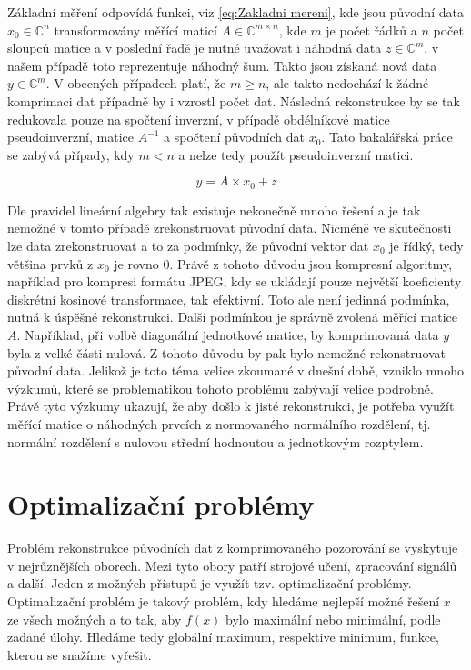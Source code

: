 \documentclass[FM,BP]{tulthesis}
\newcounter{Vzorce}
\begin{document}
Základní měření odpovídá funkci, viz \ref{eq:Zakladni mereni}, kde jsou původní data $x_0 \in \mathbb{C}^n$ transformovány měřící maticí $A \in \mathbb{C} ^{m \times n}$, kde $m$ je počet řádků a $n$ počet sloupců matice a v poslední řadě je nutné uvažovat i náhodná data $z \in \mathbb{C}^m$, v našem případě toto reprezentuje náhodný šum. Takto jsou získaná nová data $y \in \mathbb{C}^m$. V obecných případech platí, že $m \geq n$, ale takto nedochází k žádné komprimaci dat případně by i vzrostl počet dat. Následná rekonstrukce by se tak redukovala pouze na spočtení inverzní, v případě obdélníkové matice pseudoinverzní, matice $A^{-1}$ a spočtení původních dat $x_0$. Tato bakalářská práce se zabývá případy, kdy $m < n$ a nelze tedy použít pseudoinverzní matici.

\begin{equation} \label{eq:Zakladni mereni} \tag{Vzorec \theVzorce}
y = A \times x_0 + z
\end{equation}

Dle pravidel lineární algebry tak existuje nekonečně mnoho řešení a je tak nemožné v tomto případě zrekonstruovat původní data. Nicméně ve skutečnosti lze data zrekonstruovat a to za podmínky, že původní vektor dat $x_0$ je řídký, tedy většina prvků z $x_0$ je rovno $0$. Právě z tohoto důvodu jsou kompresní algoritmy, například pro kompresi formátu JPEG, kdy se ukládají pouze největší koeficienty diskrétní kosinové transformace, tak efektivní. Toto ale není jedinná podmínka, nutná k úspěšné rekonstrukci. Další podmínkou je správně zvolená měřící matice $A$. Například, při volbě diagonální jednotkové matice, by komprimovaná data $y$ byla z velké části nulová. Z tohoto důvodu by pak bylo nemožné rekonstruovat původní data. Jelikož je toto téma velice zkoumané v dnešní době, vzniklo mnoho výzkumů, které se problematikou tohoto problému zabývají velice podrobně. Právě tyto výzkumy ukazují, že aby došlo k jisté rekonstrukci, je potřeba využít měřící matice o náhodných prvcích z normovaného normálního rozdělení, tj. normální rozdělení s nulovou střední hodnoutou a jednotkovým rozptylem.

\chapter{Optimalizační problémy}
\label{ch:optproblem}
Problém rekonstrukce původních dat z komprimovaného pozorování se vyskytuje v nejrůznějších oborech.  Mezi tyto obory patří strojové učení, zpracování signálů a další. Jeden z možných přístupů je využít tzv. optimalizační problémy. Optimalizační problém je takový problém, kdy hledáme nejlepší možné řešení $x$ ze všech možných a to tak, aby $f(x)$ bylo maximální nebo minimální, podle zadané úlohy. Hledáme tedy globální maximum, respektive minimum, funkce, kterou se snažíme vyřešit. 
\end{document}
